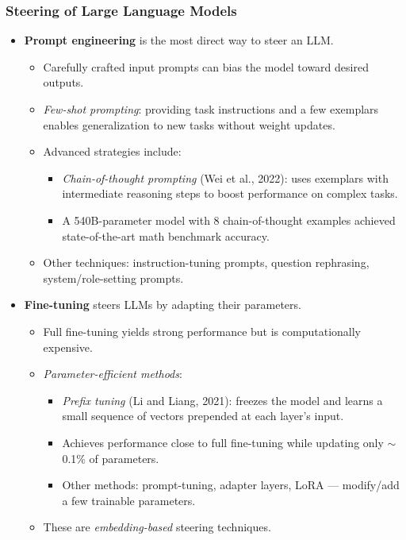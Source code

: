 \subsubsection*{Steering of Large Language Models}
\begin{itemize}
  \item \textbf{Prompt engineering} is the most direct way to steer an LLM.
        \begin{itemize}
          \item Carefully crafted input prompts can bias the model toward desired outputs.
          \item \textit{Few-shot prompting}: providing task instructions and a few exemplars enables generalization to new tasks without weight updates.
          \item Advanced strategies include:
                \begin{itemize}
                  \item \textit{Chain-of-thought prompting} (Wei et al., 2022): uses exemplars with intermediate reasoning steps to boost performance on complex tasks.
                  \item A 540B-parameter model with 8 chain-of-thought examples achieved state-of-the-art math benchmark accuracy.
                \end{itemize}
          \item Other techniques: instruction-tuning prompts, question rephrasing, system/role-setting prompts.
        \end{itemize}

  \item \textbf{Fine-tuning} steers LLMs by adapting their parameters.
        \begin{itemize}
          \item Full fine-tuning yields strong performance but is computationally expensive.
          \item \textit{Parameter-efficient methods}:
                \begin{itemize}
                  \item \textit{Prefix tuning} (Li and Liang, 2021): freezes the model and learns a small sequence of vectors prepended at each layer’s input.
                  \item Achieves performance close to full fine-tuning while updating only $\sim$0.1\% of parameters.
                  \item Other methods: prompt-tuning, adapter layers, LoRA — modify/add a few trainable parameters.
                \end{itemize}
          \item These are \textit{embedding-based} steering techniques.
        \end{itemize}


\end{itemize}
